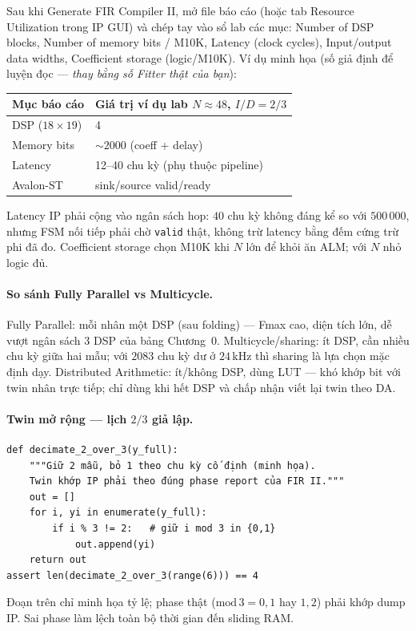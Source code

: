 Sau khi Generate FIR Compiler II, mở file báo cáo (hoặc tab Resource Utilization trong IP GUI) và chép tay vào sổ lab các mục: Number of DSP blocks, Number of memory bits / M10K, Latency (clock cycles), Input/output data widths, Coefficient storage (logic/M10K). Ví dụ minh họa (số giả định để luyện đọc --- \emph{thay bằng số Fitter thật của bạn}):

\begin{center}\small
\begin{tabular}{@{}ll@{}}
\toprule
Mục báo cáo & Giá trị ví dụ lab $N\approx 48$, $I/D=2/3$ \\
\midrule
DSP ($18\times 19$) & 4 \\
Memory bits & $\sim 2000$ (coeff + delay) \\
Latency & 12--40 chu kỳ (phụ thuộc pipeline) \\
Avalon-ST & sink/source valid/ready \\
\bottomrule
\end{tabular}
\end{center}

Latency IP phải cộng vào ngân sách hop: $40$ chu kỳ không đáng kể so với $500\,000$, nhưng FSM nối tiếp phải chờ \texttt{valid} thật, không trừ latency bằng đếm cứng trừ phi đã đo. Coefficient storage chọn M10K khi $N$ lớn để khỏi ăn ALM; với $N$ nhỏ logic đủ.

\paragraph{So sánh Fully Parallel vs Multicycle.} Fully Parallel: mỗi nhân một DSP (sau folding) --- Fmax cao, diện tích lớn, dễ vượt ngân sách 3 DSP của bảng Chương~0. Multicycle/sharing: ít DSP, cần nhiều chu kỳ giữa hai mẫu; với $2083$ chu kỳ dư ở $24\,\text{kHz}$ thì sharing là lựa chọn mặc định dạy. Distributed Arithmetic: ít/không DSP, dùng LUT --- khó khớp bit với twin nhân trực tiếp; chỉ dùng khi hết DSP và chấp nhận viết lại twin theo DA.

\paragraph{Twin mở rộng --- lịch $2/3$ giả lập.}
\begin{verbatim}
def decimate_2_over_3(y_full):
    """Giữ 2 mẫu, bỏ 1 theo chu kỳ cố định (minh họa).
    Twin khớp IP phải theo đúng phase report của FIR II."""
    out = []
    for i, yi in enumerate(y_full):
        if i % 3 != 2:   # giữ i mod 3 in {0,1}
            out.append(yi)
    return out
assert len(decimate_2_over_3(range(6))) == 4
\end{verbatim}
Đoạn trên chỉ minh họa tỷ lệ; phase thật ($\mathrm{mod}\,3 = 0,1$ hay $1,2$) phải khớp dump IP. Sai phase làm lệch toàn bộ thời gian đến sliding RAM.

